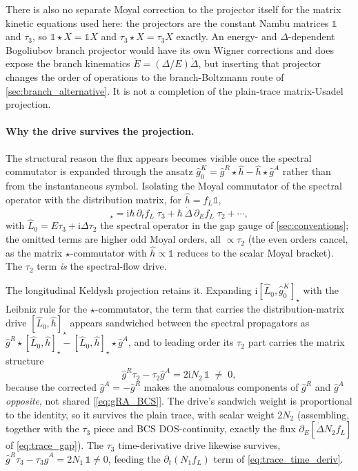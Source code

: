 \documentclass[
  aps,
  prb,
  preprint,
  superscriptaddress,
  longbibliography,
  nofootinbib
]{revtex4-2}
\newcommand{\ii}{\mathrm{i}}
\newcommand{\DOS}{N_1}
\newcommand{\fL}{f_L}
\newcommand{\hatg}{\hat{g}}
\providecommand{\openone}{}\renewcommand{\openone}{\mathds{1}}
\begin{document}
There is also no separate Moyal correction to the projector itself for the
matrix kinetic equations used here: the projectors are the constant Nambu
matrices \(\openone\) and \(\tau_3\), so
\(\openone\star X=\openone X\) and \(\tau_3\star X=\tau_3X\) exactly. An
energy- and \(\Delta\)-dependent Bogoliubov branch projector would have its
own Wigner corrections and does expose the branch kinematics
\(\dot E=(\Delta/E)\dot\Delta\), but inserting that projector changes the
order of operations to the branch-Boltzmann route of
\cref{sec:branch_alternative}. It is not a completion of the plain-trace
matrix-Usadel projection.

\paragraph{Why the drive survives the projection.} The structural reason
the flux appears becomes visible once
the spectral commutator is expanded through the ansatz
\(\hatg_0^K=\hatg^R\star\hat h-\hat h\star\hatg^A\) rather than from the
instantaneous symbol. Isolating the Moyal commutator of the spectral operator
with the distribution matrix, for \(\hat h=\fL\openone\),
\begin{equation}
  [\hat L_0,\hat h]_\star
  =
  \ii\hbar\,\partial_t\fL\;\tau_3
  +
  \hbar\,\dot\Delta\,\partial_E\fL\;\tau_2
  +\cdots,
  \label{eq:drive_L0h}
\end{equation}
with \(\hat L_0=E\tau_3+\ii\Delta\tau_2\) the spectral operator in the gap
gauge of \cref{sec:conventions}; the omitted terms are higher odd Moyal
orders, all \(\propto\tau_2\) (the even orders cancel, as the matrix
\(\star\)-commutator with \(\hat h\propto\openone\) reduces to the scalar
Moyal bracket). The \(\tau_2\) term \emph{is} the spectral-flow drive.

The longitudinal Keldysh projection retains it. Expanding
\(\ii[\hat L_0,\hatg_0^K]_\star\) with the Leibniz rule for the
\(\star\)-commutator, the term that carries the distribution-matrix drive
\([\hat L_0,\hat h]_\star\) appears sandwiched between the spectral
propagators as
\(\hatg^R\star[\hat L_0,\hat h]_\star-[\hat L_0,\hat h]_\star\star\hatg^A\),
and to leading order its \(\tau_2\) part carries the matrix structure
\begin{equation}
  \hatg^R\tau_2-\tau_2\hatg^A=2\ii N_2\,\openone\;\neq\;0,
  \label{eq:drive_cancels}
\end{equation}
because the corrected \(\hatg^A=-\hatg^R\) makes the anomalous components
of \(\hatg^R\) and \(\hatg^A\) \emph{opposite}, not shared
[\cref{eq:gRA_BCS}]. The drive's sandwich weight is proportional to the
identity, so it survives the plain trace, with scalar weight
\(2N_2\) (assembling, together with the \(\tau_3\) piece and BCS
DOS-continuity, exactly the flux
\(\partial_E[\dot\Delta N_2\fL]\) of \cref{eq:trace_gap}). The \(\tau_3\)
time-derivative drive likewise survives,
\(\hatg^R\tau_3-\tau_3\hatg^A=2\DOS\,\openone\ne0\), feeding
the \(\partial_t(\DOS\fL)\) term of \cref{eq:trace_time_deriv}.
\end{document}
